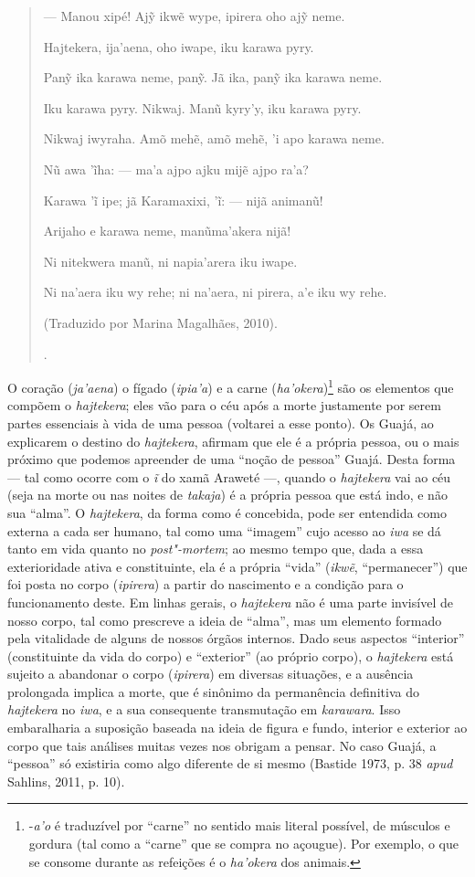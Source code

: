 \begin{quote}
{  --- Manou xipé! Ajỹ ikwẽ wype, ipirera oho ajỹ neme.

  Hajtekera, ija'aena, oho iwape, iku karawa pyry.

  Panỹ ika karawa neme, panỹ. Jã ika, panỹ ika karawa neme.

  Iku karawa pyry. Nikwaj. Manũ kyry'y, iku karawa pyry.

  Nikwaj iwyraha. Amõ mehẽ, amõ mehẽ, 'i apo karawa neme.

  Nũ awa 'ĩha: --- ma'a ajpo ajku mijẽ ajpo ra'a?

  Karawa 'ĩ ipe; jã Karamaxixi, 'ĩ: --- nijã animanũ!

  Arijaho e karawa neme, manũma'akera nijã!

  Ni nitekwera manũ, ni napia'arera iku iwape.

  Ni na'aera iku wy rehe; ni na'aera, ni pirera, a'e iku wy rehe.

  (Traduzido por Marina Magalhães, 2010).}.
\end{quote}

O coração (\emph{ja'aena}) o fígado (\emph{ipia'a}) e a carne
(\emph{ha'okera})\footnote{-\emph{a'o} é traduzível por ``carne'' no
  sentido mais literal possível, de músculos e gordura (tal como a
  ``carne'' que se compra no açougue). Por exemplo, o que se consome
  durante as refeições é o \emph{ha'okera} dos animais.} são os
elementos que compõem o \emph{hajtekera}; eles vão para o céu após a
morte justamente por serem partes essenciais à vida de uma pessoa
(voltarei a esse ponto). Os Guajá, ao explicarem o destino do
\emph{hajtekera}, afirmam que ele é a própria pessoa, ou o mais próximo
que podemos apreender de uma ``noção de pessoa'' Guajá. Desta forma --- tal
como ocorre com o \emph{ĩ} do xamã Araweté ---, quando o \emph{hajtekera}
vai ao céu (seja na morte ou nas noites de \emph{takaja}) é a própria
pessoa que está indo, e não sua ``alma''. O \emph{hajtekera}, da forma
como é concebida, pode ser entendida como externa a cada ser humano, tal
como uma ``imagem'' cujo acesso ao \emph{iwa} se dá tanto em vida quanto
no \emph{post"-mortem}; ao mesmo tempo que, dada a essa
exterioridade ativa e constituinte, ela é a própria ``vida'' (\emph{ikwẽ},
``permanecer'') que foi posta no corpo (\emph{ipirera}) a partir do
nascimento e a condição para o funcionamento deste. Em linhas gerais, o
\emph{hajtekera} não é uma parte invisível de nosso corpo, tal como
prescreve a ideia de ``alma'', mas um elemento formado pela vitalidade de
alguns de nossos órgãos internos. Dado seus aspectos ``interior''
(constituinte da vida do corpo) e ``exterior'' (ao próprio corpo), o
\emph{hajtekera} está sujeito a abandonar o corpo (\emph{ipirera}) em
diversas situações, e a ausência prolongada implica a morte, que é
sinônimo da permanência definitiva do \emph{hajtekera} no \emph{iwa}, e
a sua consequente transmutação em \emph{karawara}. Isso embaralharia a
suposição baseada na ideia de figura e fundo, interior e exterior ao
corpo que tais análises muitas vezes nos obrigam a pensar. No caso
Guajá, a ``pessoa'' só existiria como algo diferente de si mesmo (Bastide
1973, p. 38 \emph{apud} Sahlins, 2011, p. 10).

